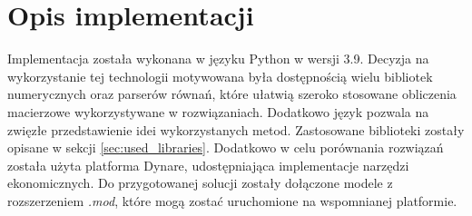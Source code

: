 \section{Opis implementacji}
\label{sec:implementation_result}

Implementacja została wykonana w języku Python w wersji 3.9. Decyzja na wykorzystanie tej technologii motywowana była dostępnością wielu bibliotek numerycznych oraz parserów równań, które ułatwią szeroko stosowane obliczenia macierzowe wykorzystywane w rozwiązaniach. Dodatkowo język pozwala na zwięzłe przedstawienie idei wykorzystanych metod. Zastosowane biblioteki zostały opisane w sekcji \ref{sec:used_libraries}. Dodatkowo w celu porównania rozwiązań została użyta platforma Dynare, udostępniająca implementacje narzędzi ekonomicznych. Do przygotowanej solucji zostały dołączone modele z rozszerzeniem \emph{.mod}, które mogą zostać uruchomione na wspomnianej platformie. 

